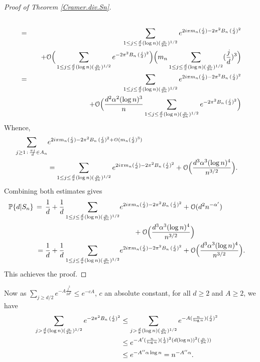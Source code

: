 \documentclass[11pt,draft,reqno]{amsart}
\theoremstyle{definition}
\theoremstyle{remarks}
\numberwithin{equation}{section}
\def \a{{\alpha}}
\def \qq{{\qquad}}
\def\P{{\mathcal P}}
\def\P{{\mathbb P}}
\begin{document}
\begin{proof}[Proof of Theorem \ref{Cramer.div.Sn}]
\begin{eqnarray*}
\cr &=&\sum_{  1\le  j\le \frac{d}{\pi}( \log n)  ( { \a \over 2 n} )^{1/2}}e^{ 2i \pi m_n(\frac{j}{d})  - 2\pi^2  B_n\,(\frac{j}{d})^2  }  
\cr &&\quad +\mathcal O \Big( \sum_{  1\le  j\le \frac{d}{\pi}( \log n)  ( { \a \over 2 n} )^{1/2}}e^{    - 2\pi^2  B_n\,(\frac{j}{d})^2  }  \Big)\Big( m_n  \sum_{  1\le  j\le \frac{d}{\pi}( \log n)  ( { \a \over 2 n} )^{1/2}}(\frac{j}{d})^3 \Big)
\cr &=&\sum_{  1\le  j\le \frac{d}{\pi}( \log n)  ( { \a \over 2 n} )^{1/2}}e^{ 2i \pi m_n(\frac{j}{d})  - 2\pi^2  B_n\,(\frac{j}{d})^2  }  
\cr &&\quad +\mathcal O \Big(   \frac{d^2 \a^2(\log n)^3}{n} \sum_{  1\le  j\le \frac{d}{\pi}( \log n)  ( { \a \over 2 n} )^{1/2}}e^{    - 2\pi^2  B_n\,(\frac{j}{d})^2  }  \Big)
\end{eqnarray*}
Whence, 
\begin{align*}  \sum_{ j\ge 1\, :\, { \pi j\over d}\in A_n} &e^{ 2i \pi m_n(\frac{j}{d})  -  2\pi^2  B_n\,(\frac{j}{d})^2+\mathcal O (m_n(\frac{j}{d})^3 ) } 
\cr &=\sum_{  1\le  j\le \frac{d}{\pi}( \log n)  ( { \a \over 2 n} )^{1/2}}e^{ 2i \pi m_n(\frac{j}{d})  - 2\pi^2  B_n\,(\frac{j}{d})^2  }  
  +\mathcal O \Big(   \frac{d^3 \a^3(\log n)^4}{n^{3/2}}   \Big) .
\end{align*}
Combining both estimates gives
\begin{align*}   
\P\{d|S_n\} \,=\, \frac{1}{d}  + \frac{1}{d}\sum_{  1\le  j\le \frac{d}{\pi}( \log n)  ( { \a \over 2 n} )^{1/2}} &  e^{ 2i \pi m_n(\frac{j}{d})  - 2\pi^2  B_n\,(\frac{j}{d})^2  }  +\mathcal O(d^2 n^{-\a'})
 \cr &\qq +\mathcal O \Big(   \frac{d^3 \a^3(\log n)^4}{n^{3/2}}   \Big)
 \cr \, = \frac{1}{d}  + \frac{1}{d}\sum_{  1\le  j\le \frac{d}{\pi}( \log n)  ( { \a \over 2 n} )^{1/2}} &  e^{ 2i \pi m_n(\frac{j}{d})  - 2\pi^2  B_n\,(\frac{j}{d})^2  }  +\mathcal O \Big(   \frac{d^3 \a^3(\log n)^4}{n^{3/2}}   \Big)
.
\end{align*}
This achieves the proof.
 \end{proof} 

 
Now  as $\sum_{j\ge d/2} e^{-A\frac{j^2}{2d^2}}\le e^{-cA }$, $c$ an absolute constant, for all $d\ge 2$ and $A\ge 2$, we have
\begin{align*}   
 \sum_{  j> \frac{d}{\pi}( \log n)  ( { \a \over 2 n} )^{1/2}}    e^{    - 2\pi^2  B_n\,(\frac{j}{d})^2  }& \le  \sum_{  j> \frac{d}{\pi}( \log n)  ( { \a \over 2 n} )^{1/2}}    e^{    - A(\frac{n}{\log n})(\frac{j}{d})^2  } 
 \cr &\le e^{    - A'(\frac{n}{\log n})(\frac{1}{d})^2(d( \log n))^2  ( { \a \over 2 n} ) )  } \cr & \le e^{    - A''\a \log n } =n^{- A''\a}.
\end{align*}
 
\end{document}
